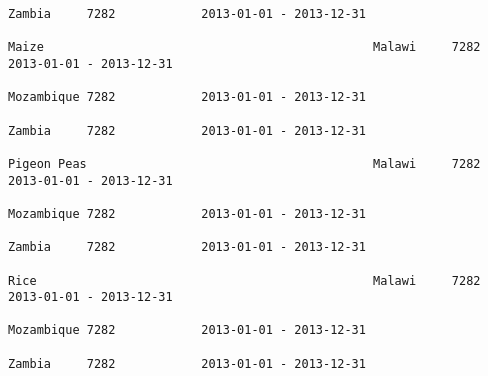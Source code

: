 \documentclass[11pt]{article}
\begin{document}
\begin{Verbatim}[commandchars=\\\{\}]
                                                                                                                                                                                                                 Zambia     7282            2013-01-01 - 2013-12-31   
                                                                                                                                                              Maize                                              Malawi     7282            2013-01-01 - 2013-12-31   
                                                                                                                                                                                                                 Mozambique 7282            2013-01-01 - 2013-12-31   
                                                                                                                                                                                                                 Zambia     7282            2013-01-01 - 2013-12-31   
                                                                                                                                                              Pigeon Peas                                        Malawi     7282            2013-01-01 - 2013-12-31   
                                                                                                                                                                                                                 Mozambique 7282            2013-01-01 - 2013-12-31   
                                                                                                                                                                                                                 Zambia     7282            2013-01-01 - 2013-12-31   
                                                                                                                                                              Rice                                               Malawi     7282            2013-01-01 - 2013-12-31   
                                                                                                                                                                                                                 Mozambique 7282            2013-01-01 - 2013-12-31   
                                                                                                                                                                                                                 Zambia     7282            2013-01-01 - 2013-12-31   

\end{Verbatim}
\end{document}
